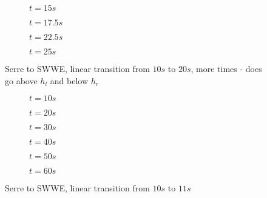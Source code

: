 \documentclass[10pt]{article}
\begin{document}
\begin{figure}
	\centering
	\begin{subfigure}{0.49\textwidth}
		\centering
		
		\caption{$t=15s$}
	\end{subfigure}
	\begin{subfigure}{0.49\textwidth}
		\centering
		
		\caption{$t=17.5s$}
	\end{subfigure}
	\begin{subfigure}{0.49\textwidth}
		\centering
		
		\caption{$t=22.5s$}
	\end{subfigure}
	\begin{subfigure}{0.49\textwidth}
		\centering
		
		\caption{$t=25s$}
	\end{subfigure}
\caption{ Serre to SWWE, linear transition from $10s$ to $20s$, more times - does go above $h_l$ and below $h_r$}
\end{figure}


\begin{figure}
	\centering
	\begin{subfigure}{0.49\textwidth}
		\centering
		
		\caption{$t=10s$}
	\end{subfigure}
	\begin{subfigure}{0.49\textwidth}
		\centering
		
		\caption{$t=20s$}
	\end{subfigure}
	\begin{subfigure}{0.49\textwidth}
		\centering
		
		\caption{$t=30s$}
	\end{subfigure}
	\begin{subfigure}{0.49\textwidth}
		\centering
		
		\caption{$t=40s$}
	\end{subfigure}
	\begin{subfigure}{0.49\textwidth}
		\centering
		
		\caption{$t=50s$}
	\end{subfigure}
	\begin{subfigure}{0.49\textwidth}
		\centering
		
		\caption{$t=60s$}
	\end{subfigure}
	\caption{ Serre to SWWE, linear transition from $10s$ to $11s$}
\end{figure}
\end{document}
